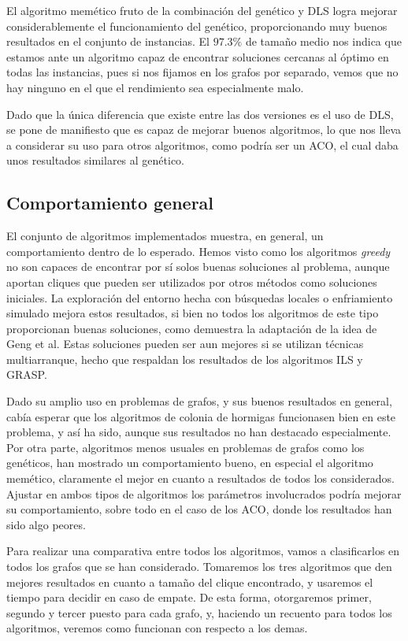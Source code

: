 El algoritmo memético fruto de la combinación del genético y DLS logra mejorar
considerablemente el funcionamiento del genético, proporcionando muy buenos resultados
en el conjunto de instancias. El $97.3\%$ de tamaño medio nos indica que estamos
ante un algoritmo capaz de encontrar soluciones cercanas al óptimo en todas las
instancias, pues si nos fijamos en los grafos por separado, vemos que no hay ninguno
en el que el rendimiento sea especialmente malo.

Dado que la única diferencia que existe entre las dos versiones es el uso de DLS,
se pone de  manifiesto que es capaz de mejorar buenos algoritmos, lo que nos lleva
a considerar su uso para otros algoritmos, como podría ser un ACO, el cual daba
unos resultados similares al genético.

\subsection{Comportamiento general}

El conjunto de algoritmos implementados muestra, en general, un comportamiento dentro de
lo esperado. Hemos visto como los algoritmos \textit{greedy} no son capaces de encontrar
por sí solos buenas soluciones al problema, aunque aportan cliques que pueden ser utilizados
por otros métodos como soluciones iniciales. La exploración del entorno hecha con búsquedas
locales o enfriamiento simulado mejora estos resultados, si bien no todos los algoritmos de
este tipo proporcionan buenas soluciones, como demuestra la adaptación de la idea de Geng
et al. Estas soluciones pueden ser aun mejores si se utilizan técnicas multiarranque,
hecho que respaldan los resultados de los algoritmos ILS y GRASP.

Dado su amplio uso en problemas de grafos, y sus buenos resultados en general, cabía
esperar que los algoritmos de colonia de hormigas funcionasen bien en este problema, y
así ha sido, aunque sus resultados no han destacado especialmente. Por otra parte,
algoritmos menos usuales en problemas de grafos como los genéticos, han mostrado un
comportamiento bueno, en especial el algoritmo memético, claramente el mejor en
cuanto a resultados de todos los considerados. Ajustar en ambos tipos de algoritmos
los parámetros involucrados podría mejorar su comportamiento, sobre todo en el caso
de los ACO, donde los resultados han sido algo peores.

Para realizar una comparativa entre todos los algoritmos, vamos a clasificarlos en
todos los grafos que se han considerado. Tomaremos los tres algoritmos que den mejores
resultados en cuanto a tamaño del clique encontrado, y usaremos el tiempo para decidir
en caso de empate. De esta forma, otorgaremos primer, segundo y tercer puesto para
cada grafo, y, haciendo un recuento para todos los algoritmos, veremos como funcionan
con respecto a los demas.

